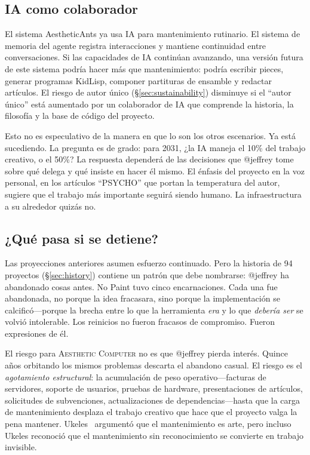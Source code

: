 \documentclass[10pt,letterpaper,twocolumn]{article}
\newcommand{\ac}{\textsc{Aesthetic Computer}}
\begin{document}
\subsection{IA como colaborador}

El sistema AestheticAnts ya usa IA para mantenimiento rutinario. El sistema de memoria del agente registra interacciones y mantiene continuidad entre conversaciones. Si las capacidades de IA continúan avanzando, una versión futura de este sistema podría hacer más que mantenimiento: podría escribir pieces, generar programas KidLisp, componer partituras de ensamble y redactar artículos. El riesgo de autor único (\S\ref{sec:sustainability}) disminuye si el ``autor único'' está aumentado por un colaborador de IA que comprende la historia, la filosofía y la base de código del proyecto.

Esto no es especulativo de la manera en que lo son los otros escenarios. Ya está sucediendo. La pregunta es de grado: para 2031, ¿la IA maneja el 10\% del trabajo creativo, o el 50\%? La respuesta dependerá de las decisiones que @jeffrey tome sobre qué delega y qué insiste en hacer él mismo. El énfasis del proyecto en la voz personal, en los artículos ``PSYCHO'' que portan la temperatura del autor, sugiere que el trabajo más importante seguirá siendo humano. La infraestructura a su alrededor quizás no.

\subsection{¿Qué pasa si se detiene?}
\label{sec:giveup}

Las proyecciones anteriores asumen esfuerzo continuado. Pero la historia de 94 proyectos (\S\ref{sec:history}) contiene un patrón que debe nombrarse: @jeffrey ha abandonado cosas antes. No Paint tuvo cinco encarnaciones. Cada una fue abandonada, no porque la idea fracasara, sino porque la implementación se calcificó---porque la brecha entre lo que la herramienta \emph{era} y lo que \emph{debería ser} se volvió intolerable. Los reinicios no fueron fracasos de compromiso. Fueron expresiones de él.

El riesgo para \ac{} no es que @jeffrey pierda interés. Quince años orbitando los mismos problemas descarta el abandono casual. El riesgo es el \emph{agotamiento estructural}: la acumulación de peso operativo---facturas de servidores, soporte de usuarios, pruebas de hardware, presentaciones de artículos, solicitudes de subvenciones, actualizaciones de dependencias---hasta que la carga de mantenimiento desplaza el trabajo creativo que hace que el proyecto valga la pena mantener. Ukeles~\citep{ukeles1969manifesto} argumentó que el mantenimiento es arte, pero incluso Ukeles reconoció que el mantenimiento sin reconocimiento se convierte en trabajo invisible.
\end{document}
